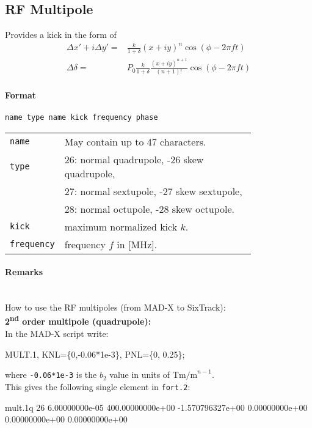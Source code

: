 \subsection{RF Multipole}

Provides a kick in the form of
\begin{align}
    \Delta x'+i\Delta y' =& \frac{k}{1+\delta} (x+iy)^n \cos (\phi - 2 \pi f t) \\
    \Delta \delta =& P_0 \frac{k}{1+\delta} \frac{(x+iy)^{n+1}}{(n+1)!} \cos (\phi - 2 \pi f t)
\end{align}

\paragraph{Format} \texttt{name type name kick frequency phase}

\bigskip
\begin{tabular}{@{}lp{0.8\linewidth}}
    \texttt{name} & May contain up to 47 characters. \\
    \texttt{type} & 26: normal quadrupole, -26 skew quadrupole, \\
                  & 27: normal sextupole, -27 skew sextupole, \\
                  & 28: normal octupole, -28 skew octupole. \\
    \texttt{kick} & maximum normalized kick $k$. \\
    \texttt{frequency} & frequency $f$ in [MHz].
\end{tabular}

\paragraph{Remarks}~\\
How to use the RF multipoles (from MAD-X to SixTrack):\\

\noindent\textbf{2\textsuperscript{nd} order multipole (quadrupole):}\\
\noindent In the MAD-X script write:
\begin{ctverbatim}
MULT.1, KNL=\{0,-0.06*1e-3\}, PNL=\{0, 0.25\};
\end{ctverbatim}
where \texttt{-0.06*1e-3} is the $b_2$ value in units of $\mathrm{Tm/m}^{n-1}$.\\
This gives the following single element in \texttt{fort.2}:
\begin{ctverbatim}
mult.1q  26  6.00000000e-05  400.00000000e+00  -1.570796327e+00  0.00000000e+00  0.00000000e+00  0.00000000e+00
\end{ctverbatim}

